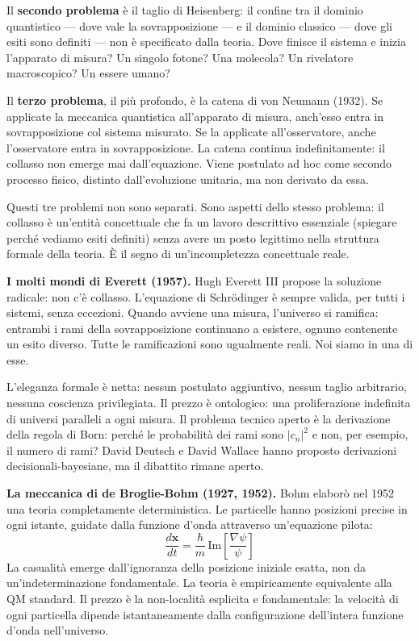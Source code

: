 \documentclass[12pt,a4paper,openany]{book}
\newcommand{\sezione}[1]{\vspace{1.2em}{\large\bfseries #1}\vspace{0.5em}\par}
\begin{document}
Il \textbf{secondo problema} è il taglio di Heisenberg: il confine tra il dominio quantistico — dove vale la sovrapposizione — e il dominio classico — dove gli esiti sono definiti — non è specificato dalla teoria. Dove finisce il sistema e inizia l'apparato di misura? Un singolo fotone? Una molecola? Un rivelatore macroscopico? Un essere umano?

Il \textbf{terzo problema}, il più profondo, è la catena di von Neumann (1932). Se applicate la meccanica quantistica all'apparato di misura, anch'esso entra in sovrapposizione col sistema misurato. Se la applicate all'osservatore, anche l'osservatore entra in sovrapposizione. La catena continua indefinitamente: il collasso non emerge mai dall'equazione. Viene postulato ad hoc come secondo processo fisico, distinto dall'evoluzione unitaria, ma non derivato da essa.

Questi tre problemi non sono separati. Sono aspetti dello stesso problema: il collasso è un'entità concettuale che fa un lavoro descrittivo essenziale (spiegare perché vediamo esiti definiti) senza avere un posto legittimo nella struttura formale della teoria. È il segno di un'incompletezza concettuale reale.

\sezione{Le interpretazioni}

\textbf{I molti mondi di Everett (1957).} Hugh Everett III propose la soluzione radicale: non c'è collasso. L'equazione di Schrödinger è sempre valida, per tutti i sistemi, senza eccezioni. Quando avviene una misura, l'universo si ramifica: entrambi i rami della sovrapposizione continuano a esistere, ognuno contenente un esito diverso. Tutte le ramificazioni sono ugualmente reali. Noi siamo in una di esse.

L'eleganza formale è netta: nessun postulato aggiuntivo, nessun taglio arbitrario, nessuna coscienza privilegiata. Il prezzo è ontologico: una proliferazione indefinita di universi paralleli a ogni misura. Il problema tecnico aperto è la derivazione della regola di Born: perché le probabilità dei rami sono $|c_n|^2$ e non, per esempio, il numero di rami? David Deutsch e David Wallace hanno proposto derivazioni decisionali-bayesiane, ma il dibattito rimane aperto.

\textbf{La meccanica di de Broglie-Bohm (1927, 1952).} Bohm elaborò nel 1952 una teoria completamente deterministica. Le particelle hanno posizioni precise in ogni istante, guidate dalla funzione d'onda attraverso un'equazione pilota:
\[
\frac{d\mathbf{x}}{dt} = \frac{\hbar}{m}\,\mathrm{Im}\!\left[\frac{\nabla\psi}{\psi}\right]
\]
La casualità emerge dall'ignoranza della posizione iniziale esatta, non da un'indeterminazione fondamentale. La teoria è empiricamente equivalente alla QM standard. Il prezzo è la non-località esplicita e fondamentale: la velocità di ogni particella dipende istantaneamente dalla configurazione dell'intera funzione d'onda nell'universo.
\end{document}
